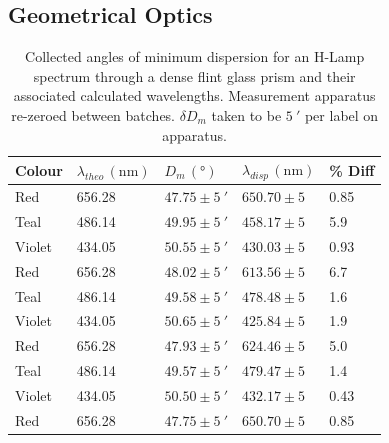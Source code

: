\documentclass[10pt, twocolumn]{article}
\theoremstyle{definition}
\begin{document}
\subsection{Geometrical Optics}
\begin{table}[ht!]
  \centering%
  \caption{Collected angles of minimum dispersion for an H-Lamp spectrum through a dense flint glass prism and their associated calculated wavelengths.
    Measurement apparatus re-zeroed between batches. $\delta D_m$ taken to be $\qty{5}{\arcminute}$ per label on apparatus.\\}
  \begin{tabular}{lllll}
    \toprule
    Colour & $\lambda_{theo}\, (\unit{\nano\meter})$ & $D_m\, (\unit{\degree})$        & $\lambda_{disp}\, (\unit{\nano\meter})$ & \% Diff \\
    \midrule
    Red    & 656.28                                  & $47.75 \pm \qty{5}{\arcminute}$ & $650.70 \pm 5$                          & 0.85    \\
    Teal   & 486.14                                  & $49.95 \pm \qty{5}{\arcminute}$ & $458.17 \pm 5$                          & 5.9     \\
    Violet & 434.05                                  & $50.55 \pm \qty{5}{\arcminute}$ & $430.03 \pm 5$                          & 0.93    \\
    \midrule
    Red    & 656.28                                  & $48.02 \pm \qty{5}{\arcminute}$ & $613.56 \pm 5$                          & 6.7     \\
    Teal   & 486.14                                  & $49.58 \pm \qty{5}{\arcminute}$ & $478.48 \pm 5$                          & 1.6     \\
    Violet & 434.05                                  & $50.65 \pm \qty{5}{\arcminute}$ & $425.84 \pm 5$                          & 1.9     \\
    \midrule
    Red    & 656.28                                  & $47.93 \pm \qty{5}{\arcminute}$ & $624.46 \pm 5$                          & 5.0     \\
    Teal   & 486.14                                  & $49.57 \pm \qty{5}{\arcminute}$ & $479.47 \pm 5$                          & 1.4     \\
    Violet & 434.05                                  & $50.50 \pm \qty{5}{\arcminute}$ & $432.17 \pm 5$                          & 0.43    \\
    \midrule
    Red    & 656.28                                  & $47.75 \pm \qty{5}{\arcminute}$ & $650.70 \pm 5$                          & 0.85    \\

\end{tabular}
\end{table}
\end{document}
